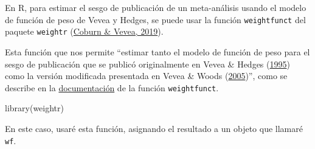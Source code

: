 \documentclass[
  bookmarksnumbered]{article}
\newenvironment{Shaded}{\begin{snugshade}}{\end{snugshade}}
\newcommand{\AttributeTok}[1]{\textcolor[rgb]{0.00,0.34,0.68}{#1}}
\newcommand{\ConstantTok}[1]{\textcolor[rgb]{0.67,0.33,0.00}{#1}}
\newcommand{\FunctionTok}[1]{\textcolor[rgb]{0.39,0.29,0.61}{#1}}
\newcommand{\NormalTok}[1]{\textcolor[rgb]{0.12,0.11,0.11}{#1}}
\newcommand{\OtherTok}[1]{\textcolor[rgb]{0.00,0.43,0.16}{#1}}
\newcommand{\SpecialCharTok}[1]{\textcolor[rgb]{0.24,0.68,0.91}{#1}}
\begin{document}
En R, para estimar el sesgo de publicación de un meta-análisis usando el modelo de función de peso de Vevea y Hedges, se puede usar la función \texttt{weightfunct} del paquete \texttt{weightr} (\protect\hyperlink{ref-coburnWeightr2019}{Coburn \& Vevea, 2019}).

Esta función que nos permite ``estimar tanto el modelo de función de peso para el sesgo de publicación que se publicó originalmente en Vevea \& Hedges (\protect\hyperlink{ref-veveaGeneralLinearModel1995}{1995}) como la versión modificada presentada en Vevea \& Woods (\protect\hyperlink{ref-veveaPublicationBiasResearch2005}{2005})'', como se describe en la \href{https://www.rdocumentation.org/packages/weightr/versions/2.0.2/topics/weightfunct}{documentación} de la función \texttt{weightfunct}.

\begin{Shaded}
\begin{Highlighting}[]
\FunctionTok{library}\NormalTok{(weightr)}
\end{Highlighting}
\end{Shaded}

En este caso, usaré esta función, asignando el resultado a un objeto que llamaré \texttt{wf}.

\begin{Shaded}
\end{Shaded}
\end{document}
